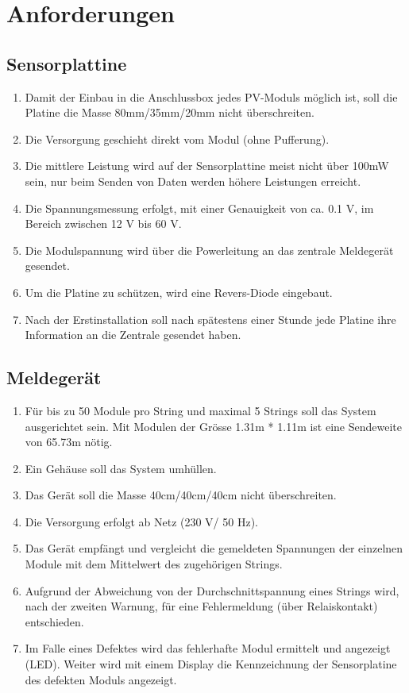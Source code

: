 %
%
%
\section{Anforderungen}

\subsection{Sensorplattine}
\begin{enumerate}
\item Damit der Einbau in die Anschlussbox jedes PV-Moduls möglich ist, soll die Platine die Masse 80mm/35mm/20mm nicht überschreiten.
\item Die Versorgung geschieht direkt vom Modul (ohne Pufferung).
\item Die mittlere Leistung wird auf der Sensorplattine meist nicht über 100mW sein, nur beim Senden von Daten werden höhere Leistungen erreicht.
\item	Die Spannungsmessung erfolgt, mit einer Genauigkeit von ca. 0.1 V, im Bereich zwischen 12 V bis 60 V.
\item	Die Modulspannung wird über die Powerleitung an das zentrale Meldegerät gesendet.
\item Um die Platine zu schützen, wird eine Revers-Diode eingebaut.
\item Nach der Erstinstallation soll nach spätestens einer Stunde jede Platine ihre Information an die Zentrale gesendet haben.
\end{enumerate}

\subsection{Meldegerät}
\begin{enumerate}
\item	Für bis zu 50 Module pro String und maximal 5 Strings soll das System ausgerichtet sein. Mit Modulen der Grösse 1.31m * 1.11m ist eine Sendeweite von 65.73m nötig.
\item	Ein Gehäuse soll das  System umhüllen.
\item Das Gerät soll die Masse 40cm/40cm/40cm nicht überschreiten.
\item	Die Versorgung erfolgt ab Netz (230 V/ 50 Hz).
\item	Das Gerät empfängt und vergleicht die gemeldeten Spannungen der einzelnen Module mit dem Mittelwert des zugehörigen Strings.
\item	Aufgrund der Abweichung von der Durchschnittspannung eines Strings wird, nach der zweiten Warnung, für eine Fehlermeldung (über Relaiskontakt) entschieden.
\item	Im Falle eines Defektes wird das fehlerhafte Modul ermittelt und angezeigt (LED). Weiter wird mit einem Display die Kennzeichnung der Sensorplatine des defekten Moduls angezeigt.

\end{enumerate}

